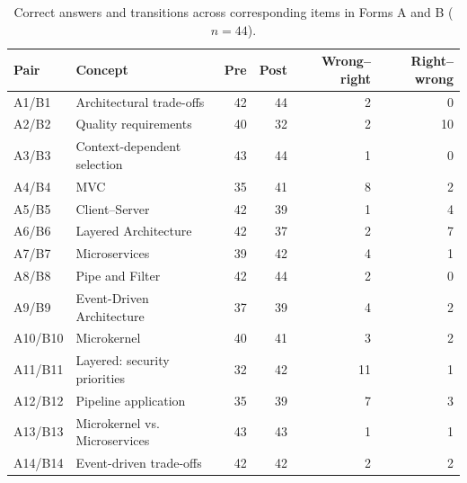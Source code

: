 \begin{table}[htbp]
\centering
\small
\caption{Correct answers and transitions across corresponding items in Forms A and B ($n=44$).}
\label{tab:item-transitions}
\begin{tabular}{llrrrr}
\toprule
Pair & Concept & Pre & Post & Wrong--right & Right--wrong \\
\midrule
A1/B1 & Architectural trade-offs & 42 & 44 & 2 & 0 \\
A2/B2 & Quality requirements & 40 & 32 & 2 & 10 \\
A3/B3 & Context-dependent selection & 43 & 44 & 1 & 0 \\
A4/B4 & MVC & 35 & 41 & 8 & 2 \\
A5/B5 & Client–Server & 42 & 39 & 1 & 4 \\
A6/B6 & Layered Architecture & 42 & 37 & 2 & 7 \\
A7/B7 & Microservices & 39 & 42 & 4 & 1 \\
A8/B8 & Pipe and Filter & 42 & 44 & 2 & 0 \\
A9/B9 & Event-Driven Architecture & 37 & 39 & 4 & 2 \\
A10/B10 & Microkernel & 40 & 41 & 3 & 2 \\
A11/B11 & Layered: security priorities & 32 & 42 & 11 & 1 \\
A12/B12 & Pipeline application & 35 & 39 & 7 & 3 \\
A13/B13 & Microkernel vs. Microservices & 43 & 43 & 1 & 1 \\
A14/B14 & Event-driven trade-offs & 42 & 42 & 2 & 2 \\
\bottomrule
\end{tabular}
\end{table}
